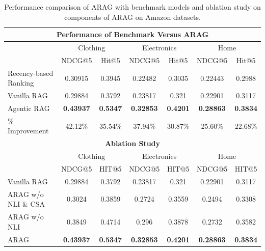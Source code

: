 \documentclass[sigconf]{acmart}
\begin{document}
\begin{table}[h]
\centering
\begin{tabular}{l|cc|cc|cc}
\hline
\multicolumn{7}{c}{\textbf{Performance of Benchmark Versus ARAG}} \\
\hline
& \multicolumn{2}{c|}{ Clothing} & \multicolumn{2}{c|}{ Electronics} & \multicolumn{2}{c}{ Home} \\
& NDCG@5 & Hit@5 & NDCG@5 & Hit@5 & NDCG@5 & Hit@5 \\
\hline
Recency-based Ranking & 0.30915 & 0.3945 & 0.22482 & 0.3035 & 0.22443 & 0.2988 \\
Vanilla RAG & 0.29884 & 0.3792 & 0.23817 & 0.321 & 0.22901 & 0.3117 \\
\hline
Agentic RAG & \textbf{0.43937} & \textbf{0.5347} & \textbf{0.32853} & \textbf{0.4201} & \textbf{0.28863} & \textbf{0.3834} \\
\% Improvement & 42.12\% & 35.54\% & 37.94\% & 30.87\% & 25.60\% & 22.68\% \\
\hline
\hline
\multicolumn{7}{c}{\textbf{Ablation Study}} \\
\hline
& \multicolumn{2}{c|}{Clothing} & \multicolumn{2}{c|}{Electronics} & \multicolumn{2}{c}{Home} \\
& NDCG@5 & HIT@5 & NDCG@5 & HIT@5 & NDCG@5 & HIT@5 \\
\hline
Vanilla RAG & 0.29884 & 0.3792 & 0.23817 & 0.321 & 0.22901 & 0.3117 \\
ARAG w/o NLI \& CSA & 0.3024 & 0.3859 & 0.2724 & 0.3559 & 0.2494 & 0.3308 \\
ARAG w/o NLI & 0.3849 & 0.4714 & 0.296 & 0.3878 & 0.2732 & 0.3582 \\
ARAG & \textbf{0.43937} & \textbf{0.5347} & \textbf{0.32853} & \textbf{0.4201} & \textbf{0.28863} & \textbf{0.3834} \\
\hline
\end{tabular}
\caption{Performance comparison of ARAG with benchmark models and ablation study on components of ARAG on Amazon datasets. 
}
\label{tab:combined}
\end{table}
\end{document}
